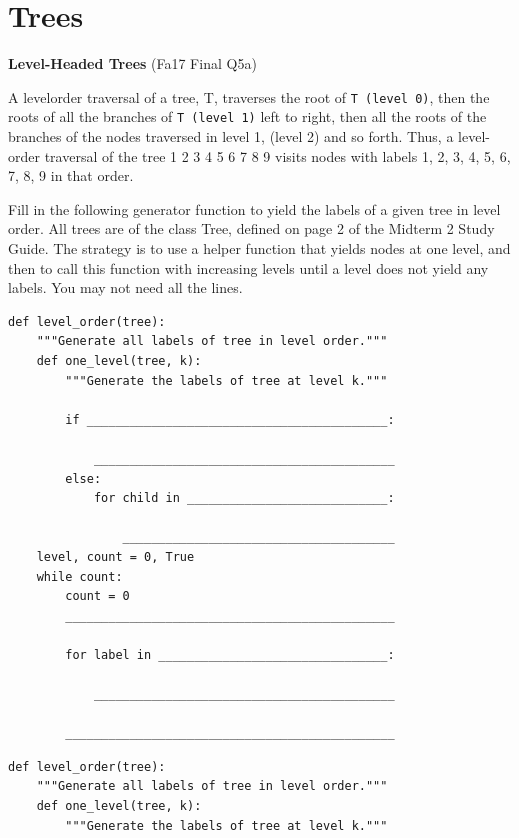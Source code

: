 \documentclass{exam}
\newlength{\currentparskip}
\newenvironment{blocksection}
{
    \setlength{\currentparskip}{\parskip}%
    \begin{minipage}{\linewidth}
    \setlength{\parskip}{\currentparskip}%
}
{
    \end{minipage}
}
\begin{document}
\section{Trees}
\begin{questions}

\begin{blocksection}
\question \textbf{Level-Headed Trees} (Fa17 Final Q5a)

A levelorder traversal of a tree, T, traverses the root of \lstinline{T (level 0)}, then the roots of all the branches of \lstinline{T (level 1)}
left to right, then all the roots of the branches of the nodes traversed in level 1, (level 2) and so forth. Thus, a
level-order traversal of the tree
                        1
                    2   3   4
                5     6    7    8    9
visits nodes with labels 1, 2, 3, 4, 5, 6, 7, 8, 9 in that order.

Fill in the following generator function to yield the labels of a given tree in level order. All trees are
of the class Tree, defined on page 2 of the Midterm 2 Study Guide. The strategy is to use a helper function
that yields nodes at one level, and then to call this function with increasing levels until a level does not yield
any labels. You may not need all the lines.
\begin{lstlisting}
def level_order(tree):
    """Generate all labels of tree in level order."""
    def one_level(tree, k):
        """Generate the labels of tree at level k."""
        
        if __________________________________________:

            __________________________________________
        else:
            for child in ____________________________:

                ______________________________________
    level, count = 0, True
    while count:
        count = 0
        ______________________________________________

        for label in ________________________________:

            __________________________________________

        ______________________________________________
\end{lstlisting}
\end{blocksection}
\begin{solution}
\begin{lstlisting}
def level_order(tree):
    """Generate all labels of tree in level order."""
    def one_level(tree, k):
        """Generate the labels of tree at level k."""
            

\end{lstlisting}
\end{solution}
\end{questions}
\end{document}
